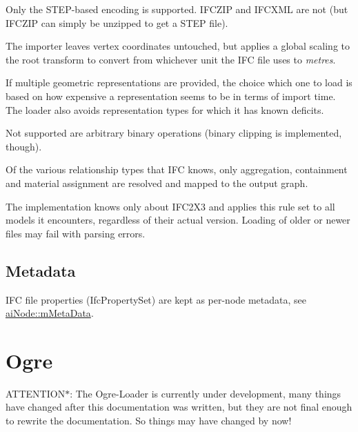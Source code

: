 \begin{DoxyItemize}
\item Only the S\+T\+E\+P-\/based encoding is supported. I\+F\+C\+Z\+I\+P and I\+F\+C\+X\+M\+L are not (but I\+F\+C\+Z\+I\+P can simply be unzipped to get a S\+T\+E\+P file).
\item The importer leaves vertex coordinates untouched, but applies a global scaling to the root transform to convert from whichever unit the I\+F\+C file uses to {\itshape metres}.
\item If multiple geometric representations are provided, the choice which one to load is based on how expensive a representation seems to be in terms of import time. The loader also avoids representation types for which it has known deficits.
\item Not supported are arbitrary binary operations (binary clipping is implemented, though).
\item Of the various relationship types that I\+F\+C knows, only aggregation, containment and material assignment are resolved and mapped to the output graph.
\item The implementation knows only about I\+F\+C2\+X3 and applies this rule set to all models it encounters, regardless of their actual version. Loading of older or newer files may fail with parsing errors.
\end{DoxyItemize}\hypertarget{importer_notes_ifc_metadata}{}\subsection{Metadata}\label{importer_notes_ifc_metadata}
I\+F\+C file properties (Ifc\+Property\+Set) are kept as per-\/node metadata, see \hyperlink{structai_node_a111b5a6cbc5dccde0cf2a17a6e5c3b67}{ai\+Node\+::m\+Meta\+Data}.



 \hypertarget{importer_notes_ogre}{}\section{Ogre}\label{importer_notes_ogre}
A\+T\+T\+E\+N\+T\+I\+O\+N$\ast$\+: The Ogre-\/\+Loader is currently under development, many things have changed after this documentation was written, but they are not final enough to rewrite the documentation. So things may have changed by now!

